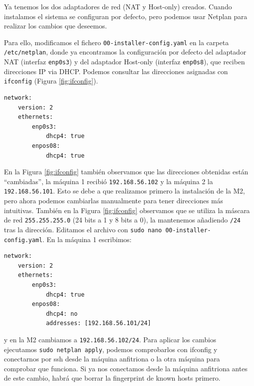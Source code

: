 \documentclass{article}
\begin{document}
Ya tenemos los dos adaptadores de red (NAT y Host-only) creados. Cuando instalamos el sistema se configuran por defecto,
pero podemos usar Netplan para realizar los cambios que deseemos.

Para ello, modificamos el fichero \texttt{00-installer-config.yaml} en la carpeta \texttt{/etc/netplan}, donde ya encontramos
 la configuración por defecto del adaptador NAT (interfaz \texttt{enp0s3}) y del adaptador Host-only (interfaz \texttt{enp0s8}),
 que reciben direcciones IP via DHCP. Podemos consultar las direcciones asignadas con \texttt{ifconfig} (Figura \ref{fig:ifconfig}).

\begin{Verbatim}[tabsize=4]
network:
	version: 2
	ethernets:
		enp0s3:
			dhcp4: true
		enpos08:
			dhcp4: true
\end{Verbatim}

En la Figura \ref{fig:ifconfig} también observamos que las direcciones obtenidas están ``cambiadas'', la máquina 1 recibió
 \texttt{192.168.56.102} y la máquina 2 la \texttt{192.168.56.101}. Esto se debe a que realizamos primero la instalación de la M2,
 pero ahora podemos cambiarlas manualmente para tener direcciones más intuitivas. También en la Figura \ref{fig:ifconfig} observamos
 que se utiliza la máscara de red \texttt{255.255.255.0} (24 bits a 1 y 8 bits a 0), la mantenemos añadiendo \texttt{/24} tras la dirección.
  Editamos el archivo con 
 \texttt{sudo nano 00-installer-config.yaml}. En la máquina 1 escribimos:

\begin{Verbatim}[tabsize=4]
network:
	version: 2
	ethernets:
		enp0s3:
			dhcp4: true
		enpos08:
			dhcp4: no
			addresses: [192.168.56.101/24]
\end{Verbatim}

y en la M2 cambiamos a \texttt{192.168.56.102/24}. Para aplicar los cambios ejecutamos \texttt{sudo netplan apply}, podemos comprobarlos
con ifconfig y conectarnos por ssh desde la máquina anfitriona o la otra máquina para comprobar que funciona. Si ya nos conectamos
desde la máquina anfitriona antes de este cambio, habrá que borrar la fingerprint de known hosts primero.
\end{document}

